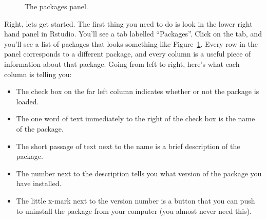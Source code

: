 
\begin{figure}[t]
\begin{center}
\caption{The packages panel.}
\HR
\label{fig:packagepanel}
\end{center}
\end{figure}

Right, lets get started. The first thing you need to do is look in the lower right hand panel in Rstudio. You'll see a tab labelled ``Packages''. Click on the tab, and you'll see a list of packages that looks something like Figure~\ref{fig:packagepanel}. Every row in the panel corresponds to a different package, and every column is a useful piece of information about that package. Going from left to right, here's what each column is telling you:

\begin{itemize}
\item The check box on the far left column indicates whether or not the package is loaded.
\item The one word of text immediately to the right of the check box is the name of the package.
\item The short passage of text next to the name is a brief description of the package.
\item The number next to the description tells you what version of the package you have installed.
\item The little x-mark next to the version number is a button that you can push to uninstall the package from your computer (you almost never need this).
\end{itemize}


